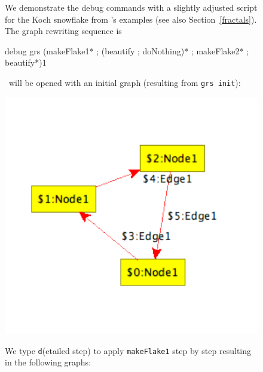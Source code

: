 \begin{figure}[htbp]
\begin{example}\label{ex:debug}  
We demonstrate the debug commands with a slightly adjusted script for the Koch snowflake from \GrG's examples (see also Section~\ref{fractals}). The graph rewriting sequence is
\begin{grshell}
debug grs (makeFlake1* ; (beautify ; doNothing)* ; makeFlake2* ; beautify*){1}
\end{grshell}
\yComp\ will be opened with an initial graph (resulting from \texttt{grs init}):
\begin{center}
  \includegraphics[width=0.3\linewidth]{fig/debug0tra}
\end{center}
We type \texttt{d}(etailed step) to apply \texttt{makeFlake1} step by step resulting in the following graphs:
\begin{center}

\end{center}
\end{example}
\end{figure}
